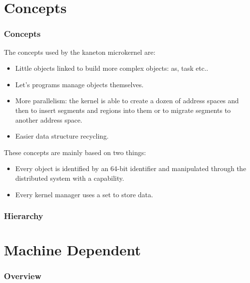 {%
%

\section{Concepts}


\begin{frame}
  \frametitle{Concepts}

  The concepts used by the kaneton microkernel are:

  \begin{itemize}[<+->]
    \item
      Little objects linked to build more complex objects:
      as, task etc..
    \item
      Let's programs manage objects themselves.
    \item
      More parallelism: the kernel is able to create a dozen
      of address spaces and then to insert segments and regions
      into them or to migrate segments to another address space.
    \item
      Easier data structure recycling.
  \end{itemize}

  These concepts are mainly based on two things:

  \begin{itemize}[<+->]
    \item
      Every object is identified by an 64-bit identifier and manipulated
      through the distributed system with a capability.
    \item
      Every kernel manager uses a set to store data.
  \end{itemize}
\end{frame}


\begin{frame}
  \frametitle{Hierarchy}

  \begin{center}
  \end{center}
\end{frame}

%
%

\section{Machine Dependent}


\begin{frame}
  \frametitle{Overview}


\end{frame}}
